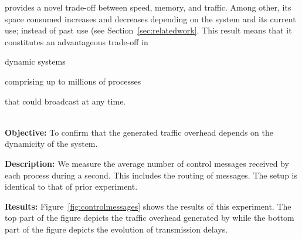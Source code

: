 \noindent \RPCBROADCAST provides a novel trade-off between speed, memory, and
traffic. Among other, its space consumed increases and decreases depending on
the system and its current use; instead of past use (see
Section~\ref{sec:relatedwork}. This result means that it constitutes an
advantageous trade-off in
\begin{inparaenum}[(i)]
\item dynamic systems
\item comprising up to millions of processes
\item that could broadcast at any time.
\end{inparaenum} \\

\noindent \textbf{Objective:} To confirm that the generated traffic overhead
depends on the dynamicity of the system.

\noindent \textbf{Description:} We measure the average number of control
messages received by each process during a second. This includes the routing of
messages. The setup is identical to that of prior experiment.

\noindent \textbf{Results:} Figure~\ref{fig:controlmessages} shows the results of
this experiment. The top part of the figure depicts the traffic overhead
generated by \RPCBROADCAST while the bottom part of the figure depicts the
evolution of transmission delays.

